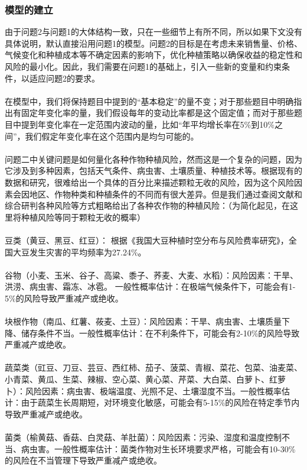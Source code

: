 \documentclass{cumcmthesis}
\begin{document}
\subsubsection{模型的建立}
由于问题2与问题1的大体结构一致，只在一些细节上有所不同，所以如果下文没有具体说明，默认直接沿用问题1的模型。问题2的目标是在考虑未来销售量、价格、气候变化和种植成本等不确定因素的影响下，优化种植策略以确保收益的稳定性和风险的最小化。因此，我们需要在问题1的基础上，引入一些新的变量和约束条件，以适应问题2的要求。\\\\
在模型中，我们将保持题目中提到的“基本稳定”的量不变；对于那些题目中明确指出有固定年变化率的量，我们假设每年的变动比率都是这个固定值；而对于那些题目中提到年变化率在一定范围内波动的量，比如“年平均增长率在5\%到10\%之间”，我们假定年变化率在这个范围内是均匀可能的。\\\\
问题二中关键问题是如何量化各种作物种植风险，然而这是一个复杂的问题，因为它涉及到多种因素，包括天气条件、病虫害、土壤质量、种植技术等。根据现有的数据和研究，很难给出一个具体的百分比来描述颗粒无收的风险，因为这个风险因素会因地区、作物种类和种植条件的不同而有很大差异。但是我们通过查阅文献和综合研判各种风险等方式粗略给出了各种农作物的种植风险：（为简化起见，在这里将种植风险等同于颗粒无收的概率）\\\\
豆类（黄豆、黑豆、红豆）：
根据《我国大豆种植时空分布与风险费率研究》\cite{ref2}，全国大豆发生灾害的平均频率为27.24\%。 \\\\
谷物（小麦、玉米、谷子、高粱、黍子、荞麦、大麦、水稻）：风险因素：干旱、洪涝、病虫害、霜冻、冰雹。
一般性概率估计：在极端气候条件下，可能会有1-5\%的风险导致严重减产或绝收。\\\\
块根作物（南瓜、红薯、莜麦、土豆）：风险因素：干旱、病虫害、土壤质量下降、储存条件不当。一般性概率估计：在不利条件下，可能会有2-10\%的风险导致严重减产或绝收。\\\\
蔬菜类（豇豆、刀豆、芸豆、西红柿、茄子、菠菜、青椒、菜花、包菜、油麦菜、小青菜、黄瓜、生菜、辣椒、空心菜、黄心菜、芹菜、大白菜、白萝卜、红萝卜）：风险因素：病虫害、极端温度、光照不足、土壤湿度不当。一般性概率估计：由于蔬菜生长周期短，对环境变化敏感，可能会有5-15\%的风险在特定季节内导致严重减产或绝收。\\\\
菌类（榆黄菇、香菇、白灵菇、羊肚菌）：风险因素：污染、湿度和温度控制不当、病虫害。一般性概率估计：菌类作物对生长环境要求严格，可能会有10-30\%的风险在不当管理下导致严重减产或绝收。\\\\
\end{document}
